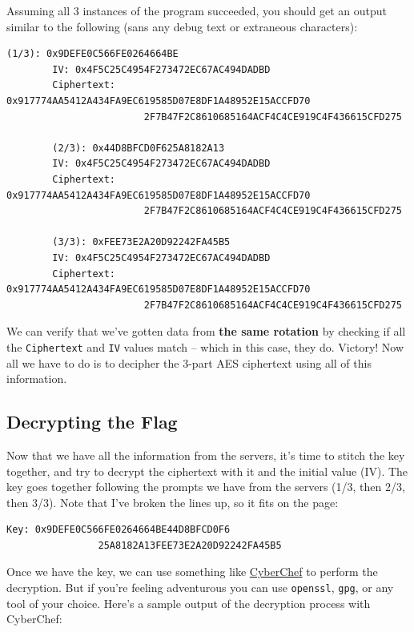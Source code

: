 \documentclass[11pt]{article}
\begin{document}
    Assuming all 3 instances of the program succeeded, you should get an output similar to the following (sans any debug text or extraneous characters):

    \begin{lstlisting}[gobble=8,label={lst:server-output}]
        (1/3): 0x9DEFE0C566FE0264664BE
        IV: 0x4F5C25C4954F273472EC67AC494DADBD
        Ciphertext: 0x917774AA5412A434FA9EC619585D07E8DF1A48952E15ACCFD70
                        2F7B47F2C8610685164ACF4C4CE919C4F436615CFD275

        (2/3): 0x44D8BFCD0F625A8182A13
        IV: 0x4F5C25C4954F273472EC67AC494DADBD
        Ciphertext: 0x917774AA5412A434FA9EC619585D07E8DF1A48952E15ACCFD70
                        2F7B47F2C8610685164ACF4C4CE919C4F436615CFD275

        (3/3): 0xFEE73E2A20D92242FA45B5
        IV: 0x4F5C25C4954F273472EC67AC494DADBD
        Ciphertext: 0x917774AA5412A434FA9EC619585D07E8DF1A48952E15ACCFD70
                        2F7B47F2C8610685164ACF4C4CE919C4F436615CFD275
    \end{lstlisting}

    We can verify that we've gotten data from \textbf{the same rotation} by checking if all the \verb`Ciphertext` and \verb`IV` values match -- which in this case, they do. Victory! Now all we have to do is to decipher the 3-part AES ciphertext using all of this information.

    \subsection{Decrypting the Flag}\label{subsec:decrypting-the-flag}

    Now that we have all the information from the servers, it's time to stitch the key together, and try to decrypt the ciphertext with it and the initial value (IV). The key goes together following the prompts we have from the servers (1/3, then 2/3, then 3/3). Note that I've broken the lines up, so it fits on the page:

    \begin{lstlisting}[gobble=8,label={lst:aes-key}]
        Key: 0x9DEFE0C566FE0264664BE44D8BFCD0F6
                25A8182A13FEE73E2A20D92242FA45B5
    \end{lstlisting}

    \pagebreak

    Once we have the key, we can use something like \href{https://gchq.github.io/CyberChef}{CyberChef} to perform the decryption. But if you're feeling adventurous you can use \verb`openssl`, \verb`gpg`, or any tool of your choice. Here's a sample output of the decryption process with CyberChef:
\end{document}
